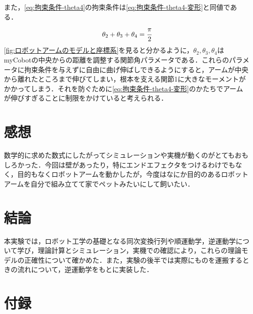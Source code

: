 \documentclass{ltjsarticle}
\begin{document}
また，\cref{eq:拘束条件-theta4}の拘束条件は\cref{eq:拘束条件-theta4-変形}と同値である．
\begin{align}
	\label{eq:拘束条件-theta4-変形}
	\theta_2 + \theta_3 + \theta_4 = \cfrac{\pi}{2}
\end{align}
\cref{fig:ロボットアームのモデルと座標系}を見ると分かるように，$\theta_2, \theta_3, \theta_4$はmyCobotの中央からの距離を調整する関節角パラメータである．これらのパラメータに拘束条件を与えずに自由に曲げ伸ばしできるようにすると，アームが中央から離れたところまで伸びてしまい，根本を支える関節1に大きなモーメントがかかってしまう．それを防ぐために\cref{eq:拘束条件-theta4-変形}のかたちでアームが伸びすぎることに制限をかけていると考えられる．

\section{感想}
数学的に求めた数式にしたがってシミュレーションや実機が動くのがとてもおもしろかった．今回は壁があったり，特にエンドエフェクタをつけるわけでもなく，目的もなくロボットアームを動かしたが，今度はなにか目的のあるロボットアームを自分で組み立てて家でペットみたいにして飼いたい．

\section{結論}
本実験では，ロボット工学の基礎となる同次変換行列や順運動学，逆運動学について学び，理論計算とシミュレーション，実機での確認により，これらの理論モデルの正確性について確かめた．また，実験の後半では実際にものを運搬するときの流れについて，逆運動学をもとに実装した．

\printbibliography[title=参考文献]

\section*{付録}







\end{document}
